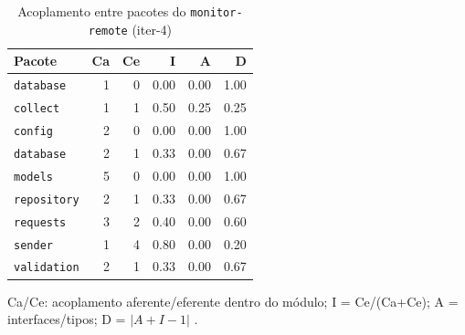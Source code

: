\begin{table}[htbp]
  \centering\small
  \caption{Acoplamento entre pacotes do \texttt{monitor-remote} (iter-4)}
  \label{tab:iter-4-acoplamento-remote}
  \begin{tabular}{lrrrrr}
    \toprule
    Pacote & Ca & Ce & I & A & D \\
    \midrule
    \texttt{database} & 1 & 0 & 0.00 & 0.00 & 1.00 \\
    \texttt{collect} & 1 & 1 & 0.50 & 0.25 & 0.25 \\
    \texttt{config} & 2 & 0 & 0.00 & 0.00 & 1.00 \\
    \texttt{database} & 2 & 1 & 0.33 & 0.00 & 0.67 \\
    \texttt{models} & 5 & 0 & 0.00 & 0.00 & 1.00 \\
    \texttt{repository} & 2 & 1 & 0.33 & 0.00 & 0.67 \\
    \texttt{requests} & 3 & 2 & 0.40 & 0.00 & 0.60 \\
    \texttt{sender} & 1 & 4 & 0.80 & 0.00 & 0.20 \\
    \texttt{validation} & 2 & 1 & 0.33 & 0.00 & 0.67 \\
    \bottomrule
  \end{tabular}
  \par\smallskip\footnotesize Ca/Ce: acoplamento aferente/eferente dentro do módulo; I = Ce/(Ca+Ce); A = interfaces/tipos; D = $|A+I-1|$ \cite{martin2002}.
\end{table}

